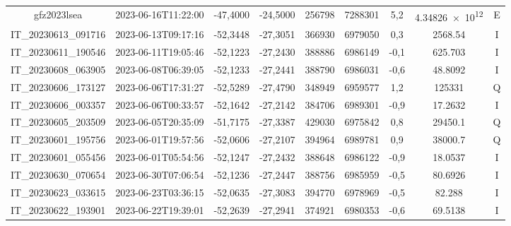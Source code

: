 \begin{table}[htb!]
\begin{tabular}{ccccS[table-format=6.0]S[table-format=7.0]ccc}
            gfz2023lsea & 2023-06-16T11:22:00 & -47,4000 & -24,5000 & 256798 & 7288301 & 5,2 & \num[round-precision=3,round-mode=figures,scientific-notation=true]{4.34826e+12} & E \\
            IT\_20230613\_091716 & 2023-06-13T09:17:16 & -52,3448 & -27,3051 & 366930 & 6979050 & 0,3 & \num[round-precision=3,round-mode=figures,scientific-notation=true]{2568.54} & I \\
            IT\_20230611\_190546 & 2023-06-11T19:05:46 & -52,1223 & -27,2430 & 388886 & 6986149 & -0,1 & \num[round-precision=3,round-mode=figures,scientific-notation=true]{625.703} & I \\
            IT\_20230608\_063905 & 2023-06-08T06:39:05 & -52,1233 & -27,2441 & 388790 & 6986031 & -0,6 & \num[round-precision=3,round-mode=figures,scientific-notation=true]{48.8092} & I \\
            IT\_20230606\_173127 & 2023-06-06T17:31:27 & -52,5289 & -27,4790 & 348949 & 6959577 & 1,2 & \num[round-precision=3,round-mode=figures,scientific-notation=true]{125331} & Q \\
            IT\_20230606\_003357 & 2023-06-06T00:33:57 & -52,1642 & -27,2142 & 384706 & 6989301 & -0,9 & \num[round-precision=3,round-mode=figures,scientific-notation=true]{17.2632} & I \\
            IT\_20230605\_203509 & 2023-06-05T20:35:09 & -51,7175 & -27,3387 & 429030 & 6975842 & 0,8 & \num[round-precision=3,round-mode=figures,scientific-notation=true]{29450.1} & Q \\
            IT\_20230601\_195756 & 2023-06-01T19:57:56 & -52,0606 & -27,2107 & 394964 & 6989781 & 0,9 & \num[round-precision=3,round-mode=figures,scientific-notation=true]{38000.7} & Q \\
            IT\_20230601\_055456 & 2023-06-01T05:54:56 & -52,1247 & -27,2432 & 388648 & 6986122 & -0,9 & \num[round-precision=3,round-mode=figures,scientific-notation=true]{18.0537} & I \\
            IT\_20230630\_070654 & 2023-06-30T07:06:54 & -52,1236 & -27,2447 & 388756 & 6985959 & -0,5 & \num[round-precision=3,round-mode=figures,scientific-notation=true]{80.6926} & I \\
            IT\_20230623\_033615 & 2023-06-23T03:36:15 & -52,0635 & -27,3083 & 394770 & 6978969 & -0,5 & \num[round-precision=3,round-mode=figures,scientific-notation=true]{82.288} & I \\
            IT\_20230622\_193901 & 2023-06-22T19:39:01 & -52,2639 & -27,2941 & 374921 & 6980353 & -0,6 & \num[round-precision=3,round-mode=figures,scientific-notation=true]{69.5138} & I \\

\end{tabular}
\end{table}
